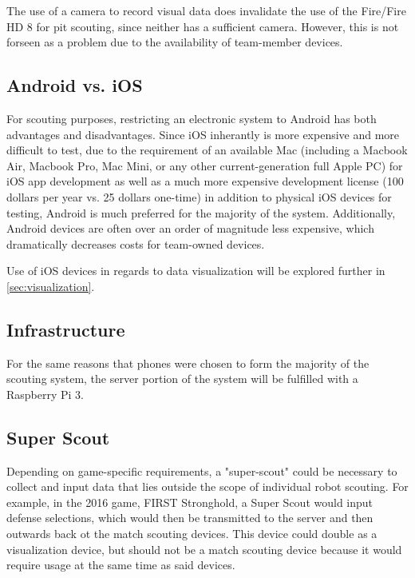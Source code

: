 \documentclass[11pt]{report}
\begin{document}
The use of a camera to record visual data does invalidate the use of the Fire/Fire HD 8 for pit scouting, since neither has a sufficient camera. However, this is not forseen as a problem due to the availability of team-member devices.

 
\subsection{Android vs. iOS}

For scouting purposes, restricting an electronic system to Android has both advantages and disadvantages. Since iOS inherantly is more expensive and more difficult to test, due to the requirement of an available Mac (including a Macbook Air, Macbook Pro, Mac Mini, or any other current-generation full Apple PC) for iOS app development as well as a much more expensive development license (100 dollars per year vs. 25 dollars one-time) in addition to physical iOS devices for testing, Android is much preferred for the majority of the system. Additionally, Android devices are often over an order of magnitude less expensive, which dramatically decreases costs for team-owned devices. \newline

Use of iOS devices in regards to data visualization will be explored further in \autoref{sec:visualization}.

\subsection{Infrastructure}

For the same reasons that phones were chosen to form the majority of the scouting system, the server portion of the system will be fulfilled with a Raspberry Pi 3.

\subsection{Super Scout}

Depending on game-specific requirements, a "super-scout" could be necessary to collect and input data that lies outside the scope of individual robot scouting. For example, in the 2016 game, FIRST Stronghold, a Super Scout would input defense selections, which would then be transmitted to the server and then outwards back ot the match scouting devices. This device could double as a visualization device, but should not be a match scouting device because it would require usage at the same time as said devices.
\end{document}
